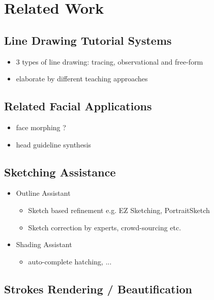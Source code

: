 \chapter{Related Work}\label{sec-related}

\section{Line Drawing Tutorial Systems}
	\begin{itemize}
		\item 3 types of line drawing: tracing, observational and free-form
		\item elaborate by different teaching approaches
	\end{itemize}
	
\section{Related Facial Applications}
	\begin{itemize} 
		\item face morphing ?
		\item head guideline synthesis
	\end{itemize}
	
\section{Sketching Assistance}
	\begin{itemize}
		\item Outline Assistant 
			\begin{itemize}
				\item Sketch based refinement e.g. EZ Sketching, PortraitSketch 
				\item Sketch correction by experts, crowd-sourcing etc.
			\end{itemize}
			
		\item Shading Assistant
			\begin{itemize} 
				\item auto-complete hatching, ...
			\end{itemize}
	\end{itemize}
	
\section{Strokes Rendering / Beautification}


